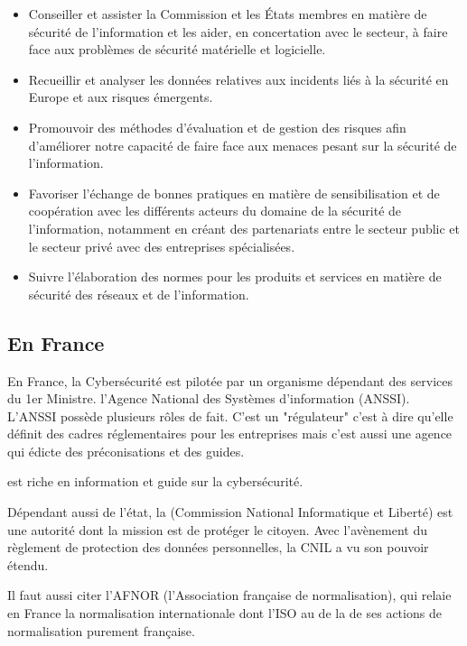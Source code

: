 \begin{itemize}
  \item Conseiller et assister la Commission et les États membres en matière de sécurité de l'information et les aider, en concertation avec le secteur, à faire face aux problèmes de sécurité matérielle et logicielle.
  \item Recueillir et analyser les données relatives aux incidents liés à la sécurité en Europe et aux risques émergents.
  \item Promouvoir des méthodes d'évaluation et de gestion des risques afin d'améliorer notre capacité de faire face aux menaces pesant sur la sécurité de l'information.
  \item Favoriser l'échange de bonnes pratiques en matière de sensibilisation et de coopération avec les différents acteurs du domaine de la sécurité de l'information, notamment en créant des partenariats entre le secteur public et le secteur privé avec des entreprises spécialisées.
  \item Suivre l'élaboration des normes pour les produits et services en matière de sécurité des réseaux et de l'information.
\end{itemize}



\subsection{En France}

En France, la Cybersécurité est pilotée par un organisme dépendant des services du 1er Ministre. l'Agence National des Systèmes d'information (ANSSI).
L'ANSSI possède plusieurs rôles de fait. C'est un "régulateur" c'est à dire qu'elle définit des cadres réglementaires pour les entreprises mais c'est aussi une agence qui édicte des préconisations et des guides.

  est riche en information et guide sur la cybersécurité.

Dépendant aussi de l'état, la  (Commission National Informatique et Liberté) est une autorité dont la mission est de protéger le citoyen. Avec l'avènement du règlement de protection des données personnelles, la CNIL a vu son pouvoir étendu.  

Il faut aussi citer l'AFNOR (l'Association française de normalisation), qui relaie en France la normalisation internationale dont l'ISO au de la de ses actions de normalisation purement française.

